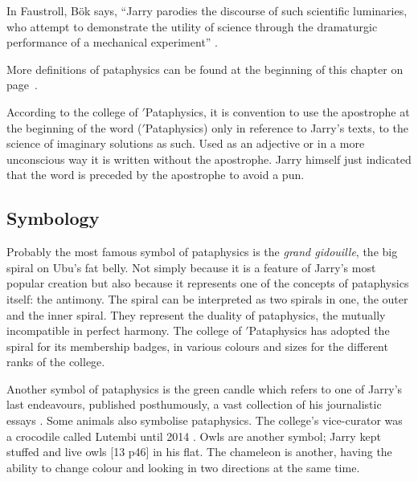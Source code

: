 In Faustroll, Bök says, ``Jarry parodies the discourse of such scientific luminaries, who attempt to demonstrate the utility of science through the dramaturgic performance of a mechanical experiment'' \citeyear[p.29]{Bok2002}.

More definitions of pataphysics can be found at the beginning of this chapter on page~\pageref{s:definitions}.

\spirals

According to the college of $'$Pataphysics, it is convention to use the apostrophe at the beginning of the word ($'$Pataphysics) only in reference to Jarry's texts, to the science of imaginary solutions as such. Used as an adjective or in a more unconscious way it is written without the apostrophe. Jarry himself just indicated that the word is preceded by the apostrophe to avoid a pun.



\subsection{Symbology}

Probably the most famous symbol of pataphysics is the \emph{grand gidouille}, the big spiral on Ubu's fat belly. Not simply because it is a feature of Jarry's most popular creation but also because it represents one of the concepts of pataphysics itself: the antimony. The spiral can be interpreted as two spirals in one, the outer and the inner spiral. They represent the duality of pataphysics, the mutually incompatible in perfect harmony. The college of $'$Pataphysics has adopted the spiral for its membership badges, in various colours and sizes for the different ranks of the college.

Another symbol of pataphysics is the green candle which refers to one of Jarry's last endeavours, published posthumously, a vast collection of his journalistic essays \autocite{Hugill2012}. Some animals also symbolise pataphysics. The college's vice-curator was a crocodile called Lutembi until 2014 \autocite{Hugill2012}. Owls are another symbol; Jarry kept stuffed and live owls \autocite[p.46]{Brotchie2011a}[13 p46] in his flat. The chameleon is another, having the ability to change colour and looking in two directions at the same time.

